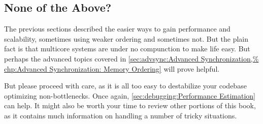 \subsection{None of the Above?}
\label{sec:app:questions:None of the Above?}

The previous sections described the easier ways to gain performance
and scalability, sometimes using weaker ordering and sometimes not.
But the plain fact is that multicore systems are under no compunction
to make life easy.
But perhaps the advanced topics covered in
\cref{sec:advsync:Advanced Synchronization,%
chp:Advanced Synchronization: Memory Ordering}
will prove helpful.

But please proceed with care, as it is all too easy to destabilize
your codebase optimizing non-bottlenecks.
Once again, \cref{sec:debugging:Performance Estimation} can help.
It might also be worth your time to review other portions of this
book, as it contains much information on handling a number of tricky
situations.
